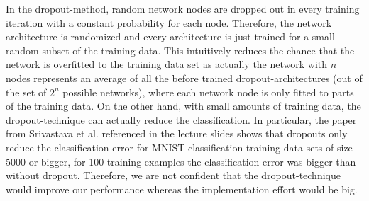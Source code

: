 \documentclass{article}
\begin{document}
In the dropout-method, random network nodes are dropped out in every training iteration with a constant probability for each node. Therefore, the network architecture is randomized and every architecture is just trained for a small random subset of the training data. This intuitively reduces the chance that the network is overfitted to the training data set as actually the network with $n$ nodes represents an average of all the before trained dropout-architectures (out of the set of $2^n$ possible networks), where each network node is only fitted to parts of the training data. On the other hand, with small amounts of training data, the dropout-technique can actually reduce the classification. In particular, the paper from Srivastava et al. referenced in the lecture slides shows that dropouts only reduce the classification error for MNIST classification training data sets of size 5000 or bigger, for 100 training examples the classification error was bigger than without dropout. Therefore, we are not confident that the dropout-technique would improve our performance whereas the implementation effort would be big.
\end{document}
